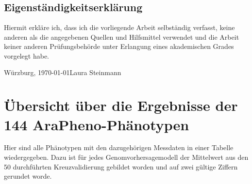 \documentclass[ngerman,onecolumn,bibliography=totocnumbered]{scrreprt}
\begin{document}
\section*{Eigenständigkeitserklärung}
	Hiermit erkläre ich, dass ich die vorliegende Arbeit selbständig verfasst, keine anderen als die
	angegebenen Quellen und Hilfsmittel verwendet und die Arbeit keiner anderen Prüfungsbehörde
	unter Erlangung eines akademischen Grades vorgelegt habe.

	\vspace{3cm}
	Würzburg, \today  \hfill Laura Steinmann\(\text{ }\)
\newpage
\chapter{Übersicht über die Ergebnisse der 144 AraPheno-Phänotypen}
\label{appendix}
Hier sind alle Phänotypen mit den dazugehörigen Messdaten in einer Tabelle wiedergegeben. Dazu ist für jedes Genomvorhersagemodell der Mittelwert aus den 50 durchführten Kreuzvalidierung gebildet worden und auf zwei gültige Ziffern gerundet worde.\\
\end{document}
